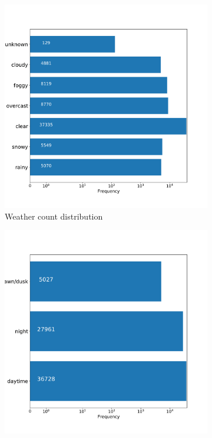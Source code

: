     \begin{figure}[H]
         \centering
         \begin{subfigure}[b]{0.495\textwidth}
             \centering
             \includegraphics[width=\textwidth]{images/EDA/BDD100K_Weather_EDA.pdf}
             \caption[Weather samples count in \acrshort{bdd} dataset]{Weather count distribution}
             \label{fig:Weather_EDA}
         \end{subfigure}
         \hfill
         \begin{subfigure}[b]{0.495\textwidth}
             \centering
             \includegraphics[width=\textwidth]{images/EDA/BDD100K_timeofday_EDA.pdf}

\end{subfigure}
\end{figure}
